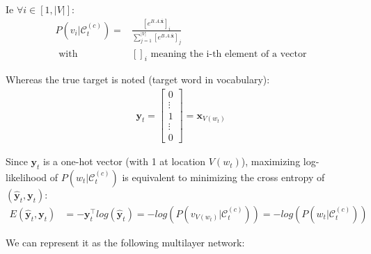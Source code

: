 Ie $\forall i \in [1, |V|]$:
\begin{align}
 P(v_i | \mathcal{C}_t^{(c)})= 
 	&\frac{  [e^{B.A.\mathbf{\bar x}}]_i}
 	{\sum_{j=1}^{|V|} [e^{B.A.\mathbf{\bar x}} ]_j} \\
 	\text{      with}& []_i \text{ meaning the i-th element of a vector}
\end{align}


Whereas the true target is noted (target word in vocabulary):
\begin{align}
 \mathbf{y}_t = 
	\begin{bmatrix} 
		0 \\
		\vdots \\
		1 \\
		\vdots \\
		0
	\end{bmatrix} 
	= \mathbf{x}_{V(w_t)}
\end{align}


Since $\mathbf{y}_t$ is a one-hot vector (with 1 at location $V(w_t)$), maximizing log-likelihood of $P(w_t | \mathcal{C}_t^{(c)})$ is equivalent to minimizing the cross entropy of $(\mathbf{\hat y}_t, \mathbf{y}_t)$:
\begin{align}
E(\mathbf{\hat y}_t, \mathbf{y}_t) &= - \mathbf{y}_t^{\top} log(\mathbf{\hat y}_t) = - log(P(v_{V(w_t)} | \mathcal{C}_t^{(c)})) =- log(P(w_t | \mathcal{C}_t^{(c)}))
\end{align}

We can represent it as the following multilayer network:

